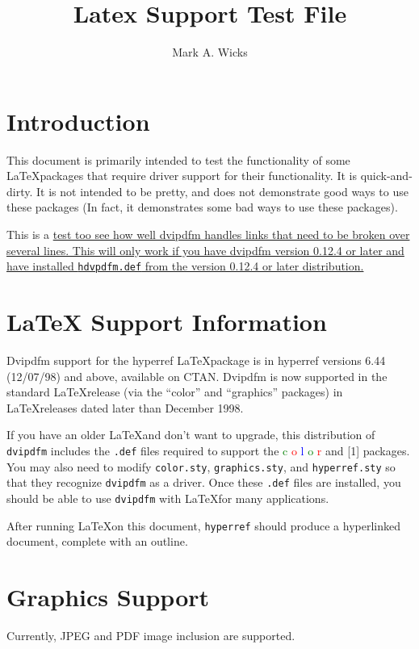 \documentclass[dvipdfm]{article}
\title{\color{blue}Latex Support Test File}
\author{\color{green}Mark A. Wicks}
\begin{document}
\maketitle
\section{Introduction}
This document is primarily intended
to test the functionality
of some \LaTeX\space packages that require
driver support for their functionality.
It is quick-and-dirty.
It is not intended to be pretty, and
does not demonstrate good ways to use these packages
(In fact, it demonstrates some bad ways to use these packages).

This is a \href{http://odo.kettering.edu/dvipdfm/}{test too see how
well dvipdfm handles links that need to be broken over several lines.  This
will only work if you have dvipdfm version 0.12.4 or later
and have installed {\tt hdvpdfm.def} from the version 0.12.4 or
later distribution.}

\section{LaTeX Support Information}
Dvipdfm support for the hyperref \LaTeX\space package is 
in hyperref versions 6.44 (12/07/98) and above, available on CTAN.
Dvipdfm is now supported in the
standard \LaTeX\space release (via the ``color'' and ``graphics'' packages) in
\LaTeX\space releases dated later than December 1998.

If you have an older LaTeX\space and don't want to upgrade,
this distribution of {\tt dvipdfm} includes
the {\tt .def} files required to support
the
{\textcolor{green}{c}%
\textcolor{red}{o}%
\textcolor{blue}{l}%
\textcolor{green}{o}%
\textcolor{red}{r}
and
\scalebox{1.3}[1]{}
packages.}
You may also need to modify {\tt color.sty}, {\tt graphics.sty},
and {\tt hyperref.sty} so that they
recognize {\tt dvipdfm} as a driver.
Once these {\tt .def} files are installed,
you should be able to use {\tt dvipdfm}
with \LaTeX\space for many applications.

After running \LaTeX\space on this
document, {\tt hyperref}
should produce a hyperlinked
document, complete with an outline.

\newpage
\section{Graphics Support}
Currently, JPEG and PDF image
inclusion are supported.
\end{document}
